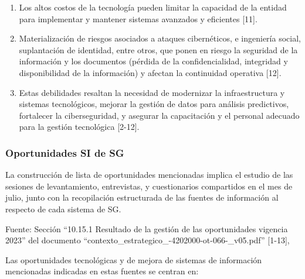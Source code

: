 \documentclass[
	a4paper, %
	12pt, %
]{include/CSSullivanBusinessReport}
\begin{document}
\begin{enumerate}
  Obsolescencia tecnológica que implica la necesidad de renovación de
  los equipos y dificulta la prestación de los servicios de la entidad
  {[}11{]}.
\item
  Los altos costos de la tecnología pueden limitar la capacidad de la
  entidad para implementar y mantener sistemas avanzados y eficientes
  {[}11{]}.
\item
  Materialización de riesgos asociados a ataques cibernéticos, e
  ingeniería social, suplantación de identidad, entre otros, que ponen
  en riesgo la seguridad de la información y los documentos (pérdida de
  la confidencialidad, integridad y disponibilidad de la información) y
  afectan la continuidad operativa {[}12{]}.
\item
  Estas debilidades resaltan la necesidad de modernizar la
  infraestructura y sistemas tecnológicos, mejorar la gestión de datos
  para análisis predictivos, fortalecer la ciberseguridad, y asegurar la
  capacitación y el personal adecuado para la gestión tecnológica
  {[}2-12{]}.
\end{enumerate}

\subsubsection{Oportunidades SI de SG}\label{sec:oportunidades-si-de-sg}

La construcción de lista de oportunidades mencionadas implica el estudio
de las sesiones de levantamiento, entrevistas, y cuestionarios
compartidos en el mes de julio, junto con la recopilación estructurada
de las fuentes de información al respecto de cada sistema de SG.

Fuente: Sección ``10.15.1 Resultado de la gestión de las oportunidades
vigencia 2023'' del documento
``contexto\_estrategico\_-4202000-ot-066-\_v05.pdf'' {[}1-13{]},

Las oportunidades tecnológicas y de mejora de sistemas de información
mencionadas indicadas en estas fuentes se centran en:
\end{document}
